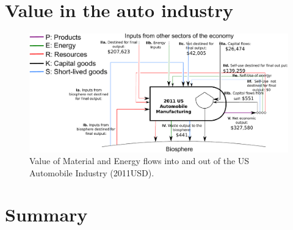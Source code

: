 \section{Value in the auto industry}
\label{sec:value_auto}

\begin{figure}[h!]
\centering
\includegraphics[width=1.0\linewidth]{Part_3/Chapter_Values/images/PERKS_basic_unit_value_auto_ind.pdf}
\caption{Value of Material and Energy flows into and out of the US Automobile Industry (2011USD).}
\label{fig:PERKS_value_auto_ind}
\end{figure}



\section{Summary}
\label{sec:value_summary}







%
%

